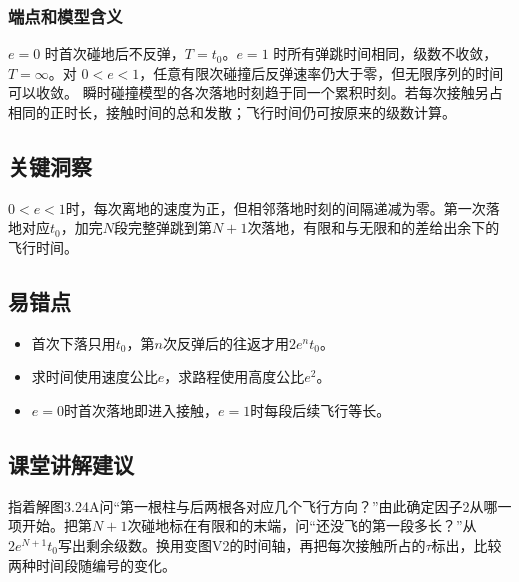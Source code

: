 \documentclass[UTF8,fontset=fandol,a4paper,11pt]{ctexart}
\begin{document}
\subsubsection*{端点和模型含义}
$e=0$ 时首次碰地后不反弹，$T=t_0$。$e=1$ 时所有弹跳时间相同，级数不收敛，$T=\infty$。对 $0<e<1$，任意有限次碰撞后反弹速率仍大于零，但无限序列的时间可以收敛。
瞬时碰撞模型的各次落地时刻趋于同一个累积时刻。若每次接触另占相同的正时长，接触时间的总和发散；飞行时间仍可按原来的级数计算。



\subsection*{关键洞察}

$0<e<1$时，每次离地的速度为正，但相邻落地时刻的间隔递减为零。第一次落地对应$t_0$，加完$N$段完整弹跳到第$N+1$次落地，有限和与无限和的差给出余下的飞行时间。



\subsection*{易错点}

\begin{itemize}
\item 首次下落只用$t_0$，第$n$次反弹后的往返才用$2e^nt_0$。
\item 求时间使用速度公比$e$，求路程使用高度公比$e^2$。
\item $e=0$时首次落地即进入接触，$e=1$时每段后续飞行等长。
\end{itemize}



\subsection*{课堂讲解建议}

指着解图3.24A问“第一根柱与后两根各对应几个飞行方向？”由此确定因子2从哪一项开始。把第$N+1$次碰地标在有限和的末端，问“还没飞的第一段多长？”从$2e^{N+1}t_0$写出剩余级数。换用变图V2的时间轴，再把每次接触所占的$\tau$标出，比较两种时间段随编号的变化。

\end{document}
